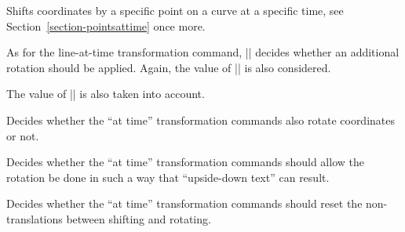 \begin{command}{\pgftransformcurveattime{}}
  Shifts coordinates by a specific point on a curve at a specific
  time, see  Section~\ref{section-pointsattime} once more.

  As for the line-at-time transformation command, |\ifpgfslopedattime|
  decides whether an additional rotation should be applied. Again, the
  value of |\ifpgfallowupsidedowattime| is also considered. 
\begin{codeexample}[]
\end{codeexample}
\begin{codeexample}[]
\end{codeexample}
  The value of |\ifpgfresetnontranslationsattime| is also taken into account.
\end{command}


{
  \let\ifpgfslopedattime=\relax
  \begin{textoken}{\ifpgfslopedattime}
    Decides whether the ``at time'' transformation commands also
    rotate coordinates or not.
  \end{textoken}
}
{
  \let\ifpgfallowupsidedowattime=\relax
  \begin{textoken}{\ifpgfallowupsidedowattime}
    Decides whether the ``at time'' transformation commands should
    allow the rotation be done in such a way that ``upside-down text''
    can result.
  \end{textoken}
}
{
  \let\ifpgfresetnontranslationsattime=\relax
  \begin{textoken}{\ifpgfresetnontranslationsattime}
    Decides whether the ``at time'' transformation commands should
    reset the non-translations between shifting and rotating.
  \end{textoken}
}


